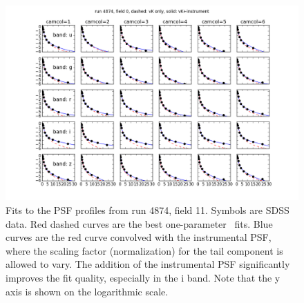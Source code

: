 \begin{figure}[th]
\centering
\includegraphics[width=1.0\textwidth]{FIGURES/psffit.png}
\vskip -0.3in
\caption{Fits to the PSF profiles from run 4874, field 11. Symbols are SDSS data. 
  Red dashed curves are the best one-parameter \vk~fits. Blue curves are the red
  curve convolved with the instrumental PSF, where the scaling factor (normalization) 
  for the tail component is allowed to vary. The addition of the instrumental PSF 
  significantly improves the fit quality, especially in the i band. Note that the y axis 
  is shown on the logarithmic scale.
\label{fig:psffit}}
\end{figure}


